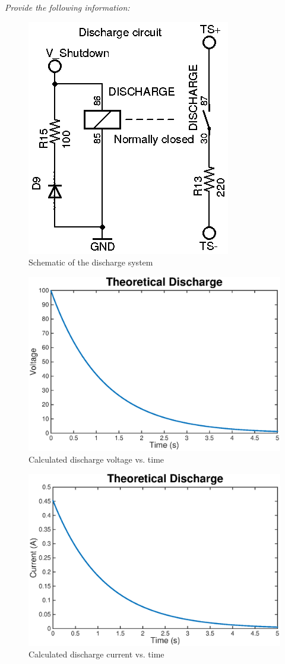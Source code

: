 \documentclass{article}
\begin{document}
\textit{Provide the following information:}

\begin{figure}[H]
    \centering
    \includegraphics[width = 0.3 \textwidth]{discharge}
    \caption{Schematic of the discharge system}
    \label{dischargeschem}
\end{figure}

    \begin{figure}[H]
        \centering
        \includegraphics[width = 0.8 \textwidth]{dischargevoltage}
        \caption{Calculated discharge voltage vs. time}
        \label{voltagedischarge}
    \end{figure}

    \begin{figure}[H]
        \centering
        \includegraphics[width = 0.8 \textwidth]{dischargecurrent}
        \caption{Calculated discharge current vs. time}
        \label{currentdischarge}
    \end{figure}
\end{document}
